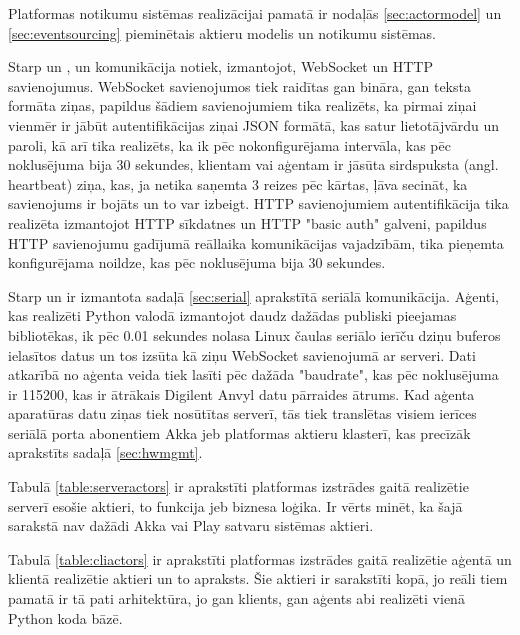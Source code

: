 Platformas notikumu sistēmas realizācijai pamatā ir nodaļās \ref{sec:actormodel}
un \ref{sec:eventsourcing} pieminētais aktieru modelis un notikumu sistēmas.

Starp  un , un
 komunikācija notiek, izmantojot, WebSocket un HTTP
savienojumus. WebSocket savienojumos tiek raidītas gan bināra, gan teksta
formāta ziņas, papildus šādiem savienojumiem tika realizēts, ka pirmai ziņai
vienmēr ir jābūt autentifikācijas ziņai JSON formātā, kas satur lietotājvārdu un
paroli, kā arī tika realizēts, ka ik pēc nokonfigurējama intervāla, kas pēc
noklusējuma bija 30 sekundes, klientam vai aģentam ir jāsūta sirdspuksta (angl.
heartbeat) ziņa, kas, ja netika saņemta 3 reizes pēc kārtas, ļāva secināt, ka
savienojums ir bojāts un to var izbeigt. HTTP savienojumiem autentifikācija tika
realizēta izmantojot HTTP sīkdatnes un HTTP "basic auth" galveni, papildus HTTP
savienojumu gadījumā reāllaika komunikācijas vajadzībām, tika pieņemta
konfigurējama noildze, kas pēc noklusējuma bija 30 sekundes.

Starp  un  ir izmantota sadaļā
\ref{sec:serial} aprakstītā seriālā komunikācija. Aģenti, kas realizēti Python
valodā izmantojot daudz dažādas publiski pieejamas bibliotēkas, ik pēc 0.01
sekundes nolasa Linux čaulas seriālo ierīču dziņu buferos ielasītos datus un tos
izsūta kā ziņu WebSocket savienojumā ar serveri. Dati atkarībā no aģenta veida
tiek lasīti pēc dažāda "baudrate", kas pēc noklusējuma ir 115200, kas ir
ātrākais Digilent Anvyl datu pārraides ātrums. Kad aģenta aparatūras datu ziņas
tiek nosūtītas serverī, tās tiek translētas visiem ierīces seriālā porta
abonentiem Akka jeb platformas aktieru klasterī, kas precīzāk aprakstīts sadaļā
\ref{sec:hwmgmt}.

Tabulā \ref{table:serveractors} ir aprakstīti platformas izstrādes gaitā
realizētie serverī esošie aktieri, to funkcija jeb biznesa loģika. Ir vērts
minēt, ka šajā sarakstā nav dažādi Akka vai Play satvaru sistēmas aktieri.

Tabulā \ref{table:cliactors} ir aprakstīti platformas izstrādes gaitā realizētie
aģentā un klientā realizētie aktieri un to apraksts. Šie aktieri ir sarakstīti
kopā, jo reāli tiem pamatā ir tā pati arhitektūra, jo gan klients, gan aģents
abi realizēti vienā Python koda bāzē.

